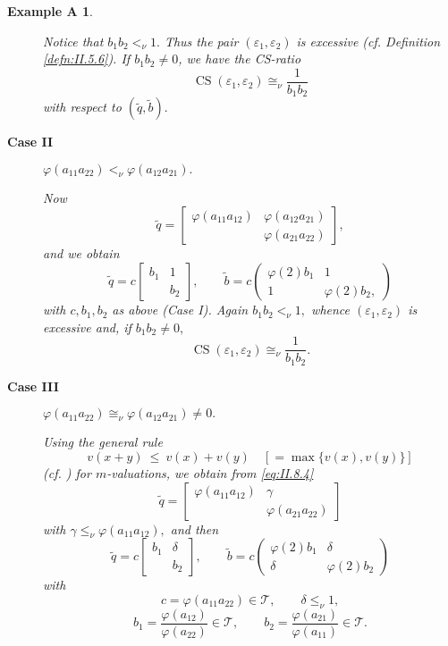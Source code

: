 \documentclass [12pt,a4paper,reqno]{amsart}
\newtheorem*{exampleA*}{Example A}
\begin{document}
\begin{exampleA*}
\begin{description}
 Notice that $b_1b_2<_\nu 1.$ Thus the pair $({\varepsilon}_1,{\varepsilon}_2)$ is excessive (cf. Definition \ref{defn:II.5.6}). If $b_1b_2\ne0$, we have the CS-ratio
 $${\operatorname{CS}}({\varepsilon}_1,{\varepsilon}_2)\cong_\nu\frac{1}{b_1b_2}$$
 with respect to $({\tilde q},{\tilde b}).$

{\vskip 1.5mm \noindent}
 \item[\textbf{Case II}]${\varphi}(a_{11}a_{22})<_\nu{\varphi}(a_{12}a_{21}).$

 Now
 $${\tilde q}=\begin{bmatrix} {\varphi}(a_{11}a_{12}) & {\varphi}(a_{12}a_{21})\\
  & {\varphi}(a_{21}a_{22})\end{bmatrix},$$
 and we obtain
 $${\tilde q}=c\begin{bmatrix} b_1 & 1\\  & b_2\end{bmatrix},\qquad{\tilde b}=c\begin{pmatrix} {\varphi}(2)b_1 & 1\\ 1 & {\varphi}(2)b_2,\end{pmatrix}$$
 with $c, b_1, b_2$ as above (Case I).
Again $b_1b_2<_\nu 1,$ whence $({\varepsilon}_1,{\varepsilon}_2)$ is excessive and, if $b_1b_2\ne0,$
$${\operatorname{CS}}({\varepsilon}_1,{\varepsilon}_2)\cong_\nu \frac{1}{b_1b_2}.$$
{\vskip 1.5mm \noindent}
\item[\textbf{Case III}] ${\varphi}(a_{11}a_{22})\cong_\nu {\varphi}(a_{12}a_{21})\ne0.$

Using the general rule
$$ v(x+y) {\ {\leq} \ } v(x) + v(y) \quad [= \max\{ v(x), v(y)\}]$$
(cf. \cite[Definition 2.1]{IKR1}) for $m$-valuations, we obtain from \eqref{eq:II.8.4}
$${\tilde q}=\begin{bmatrix} {\varphi}(a_{11}a_{12}) & \gamma\\  & {\varphi}(a_{21}a_{22})\end{bmatrix}$$
with $\gamma\le_\nu{\varphi}(a_{11}a_{12}),$ and then
$${\tilde q}=c\begin{bmatrix} b_1 &\delta\\  & b_2\end{bmatrix},\qquad {\tilde b}=c\begin{pmatrix} {\varphi}(2)b_1 & \delta\\
\delta & {\varphi}(2)b_2\end{pmatrix}$$
with
$$c={\varphi}(a_{11}a_{22})\in{\mathcal T},\qquad \delta\le_\nu1,$$
$$b_1=\frac{{\varphi}(a_{12})}{{\varphi}(a_{22})}\in{\mathcal T},\qquad b_2=\frac{{\varphi}(a_{21})}{{\varphi}(a_{11})}\in{\mathcal T}.$$


\end{description}
\end{exampleA*}
\end{document}
